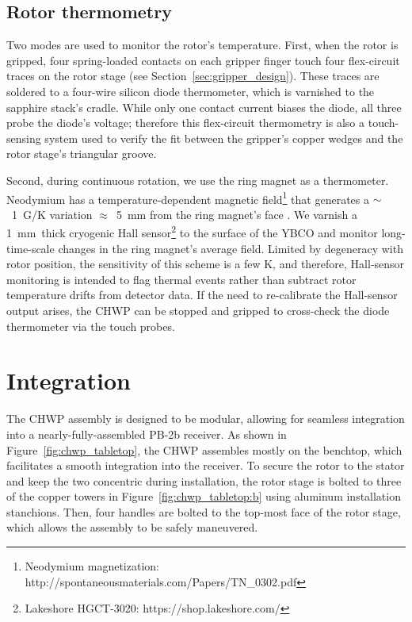 
\subsection{Rotor thermometry}
\label{sec:rotor_thermometry}

Two modes are used to monitor the rotor's temperature. First, when the rotor is gripped, four spring-loaded contacts on each gripper finger touch four flex-circuit traces on the rotor stage (see Section~\ref{sec:gripper_design}). These traces are soldered to a four-wire silicon diode thermometer, which is varnished to the sapphire stack's cradle. While only one contact current biases the diode, all three probe the diode's voltage; therefore this flex-circuit thermometry is also a touch-sensing system used to verify the fit between the gripper's copper wedges and the rotor stage's triangular groove.

Second, during continuous rotation, we use the ring magnet as a thermometer. Neodymium has a temperature-dependent magnetic field\footnote{Neodymium magnetization: \\ http://spontaneousmaterials.com/Papers/TN\_0302.pdf} that generates a $\sim$~1~G/K variation $\approx$~5~mm from the ring magnet's face \cite{Sakurai2018}. We varnish a 1~mm~thick cryogenic Hall sensor\footnote{Lakeshore HGCT-3020: https://shop.lakeshore.com/} to the surface of the YBCO and monitor long-time-scale changes in the ring magnet's average field. Limited by degeneracy with rotor position, the sensitivity of this scheme is a few K, and therefore, Hall-sensor monitoring is intended to flag thermal events rather than subtract rotor temperature drifts from detector data. If the need to re-calibrate the Hall-sensor output arises, the CHWP can be stopped and gripped to cross-check the diode thermometer via the touch probes.


\section{Integration}
\label{sec:assembly_procedure}

The CHWP assembly is designed to be modular, allowing for seamless integration into a nearly-fully-assembled PB-2b receiver. As shown in Figure~\ref{fig:chwp_tabletop}, the CHWP assembles mostly on the benchtop, which facilitates a smooth integration into the receiver. To secure the rotor to the stator and keep the two concentric during installation, the rotor stage is bolted to three of the copper towers in Figure~\ref{fig:chwp_tabletop:b} using aluminum installation stanchions. Then, four handles are bolted to the top-most face of the rotor stage, which allows the assembly to be safely maneuvered. 

